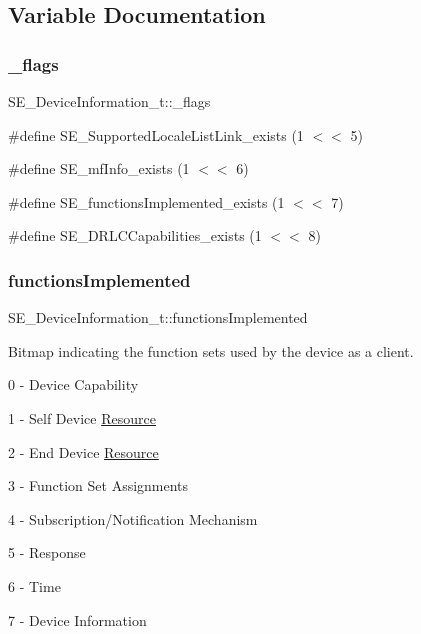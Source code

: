 \subsection{Variable Documentation}
\mbox{\label{group__DeviceInformation_gabb744ffd3504840eaaa09afcc5b8d831}} 
\subsubsection{\texorpdfstring{\+\_\+flags}{\_flags}}
{\footnotesize\ttfamily S\+E\+\_\+\+Device\+Information\+\_\+t\+::\+\_\+flags}

\#define S\+E\+\_\+\+Supported\+Locale\+List\+Link\+\_\+exists (1 $<$$<$ 5)

\#define S\+E\+\_\+mf\+Info\+\_\+exists (1 $<$$<$ 6)

\#define S\+E\+\_\+functions\+Implemented\+\_\+exists (1 $<$$<$ 7)

\#define S\+E\+\_\+\+D\+R\+L\+C\+Capabilities\+\_\+exists (1 $<$$<$ 8) \mbox{\label{group__DeviceInformation_ga17ad36c58e0576526622d098d987ae55}} 
\subsubsection{\texorpdfstring{functions\+Implemented}{functionsImplemented}}
{\footnotesize\ttfamily S\+E\+\_\+\+Device\+Information\+\_\+t\+::functions\+Implemented}

Bitmap indicating the function sets used by the device as a client.

0 -\/ Device Capability

1 -\/ Self Device \hyperlink{structResource}{Resource}

2 -\/ End Device \hyperlink{structResource}{Resource}

3 -\/ Function Set Assignments

4 -\/ Subscription/\+Notification Mechanism

5 -\/ Response

6 -\/ Time

7 -\/ Device Information

